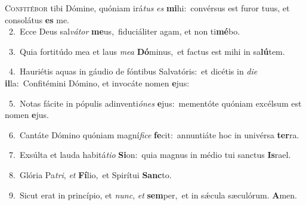 \lettrine{\initial\textcolor{\initialcolor}{C}}{onfitébor} tibi Dómine, quóniam irá\textit{tus} \textit{es} \textbf{mi}\-hi:~\star convérsus est furor tuus, et consolátus \textbf{es} me.\\
{\numbfont\textcolor{\numbcolor}{~2.}}~Ecce Deus sal\-\textit{vá}\-\textit{tor} \textbf{me}\-us,~\star fiduciáliter agam, et non ti\-\textbf{mé}\-bo.\par
{\numbfont\textcolor{\numbcolor}{~3.}}~Quia fortitúdo mea et laus \textit{me}\-\textit{a} \textbf{Dó}\-minus,~\star et factus est mihi in sa\-\textbf{lú}\-tem.\par
{\numbfont\textcolor{\numbcolor}{~4.}}~Hauriétis aquas in gáudio de fóntibus Salvatóris:~\dagger et dicétis in \textit{di}\-\textit{e} \textbf{il}\-la:~\star Confitémini Dómino, et invocáte nomen \textbf{e}\-jus:\par
{\numbfont\textcolor{\numbcolor}{~5.}}~Notas fácite in pópulis adinventi\-\textit{ó}\-\textit{nes} \textbf{e}\-jus:~\star mementóte quóniam excélsum est nomen \textbf{e}\-jus.\par
{\numbfont\textcolor{\numbcolor}{~6.}}~Cantáte Dómino quóniam magní\-\textit{fi}\-\textit{ce} \textbf{fe}\-cit:~\star annuntiáte hoc in univérsa \textbf{ter}\-ra.\par
{\numbfont\textcolor{\numbcolor}{~7.}}~Exsúlta et lauda habitá\-\textit{ti}\-\textit{o} \textbf{Si}\-on:~\star quia magnus in médio tui sanctus \textbf{Is}\-rael.\par
{\numbfont\textcolor{\numbcolor}{~8.}}~Glória Pa\-\textit{tri}\-, \textit{et} \textbf{Fí}\-lio,~\star et Spirítui \textbf{Sanc}\-to.\par
{\numbfont\textcolor{\numbcolor}{~9.}}~Sicut erat in princípio, et \textit{nunc}\-, \textit{et} \textbf{sem}\-per,~\star et in sǽcula sæculórum. \textbf{A}\-men.\par
